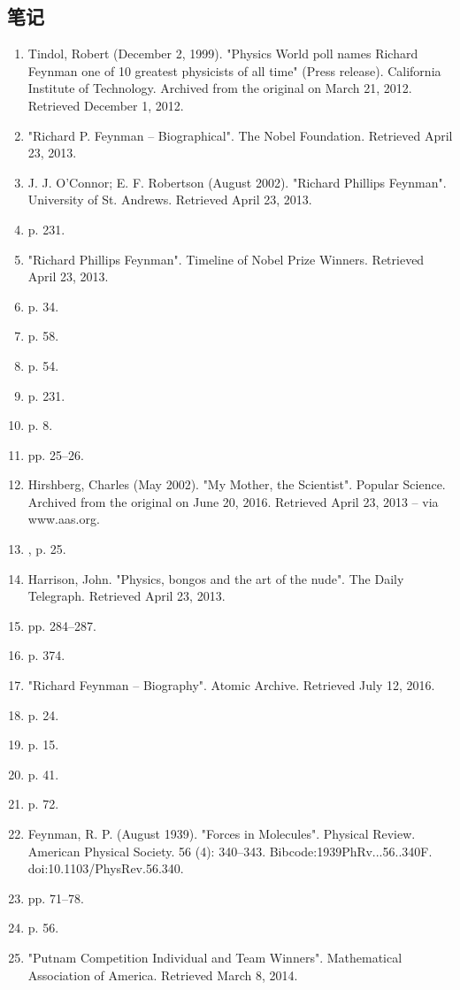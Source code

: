 \subsection{笔记}
\begin{enumerate}
\item Tindol, Robert (December 2, 1999). "Physics World poll names Richard Feynman one of 10 greatest physicists of all time" (Press release). California Institute of Technology. Archived from the original on March 21, 2012. Retrieved December 1, 2012.
\item "Richard P. Feynman – Biographical". The Nobel Foundation. Retrieved April 23, 2013.
\item J. J. O'Connor; E. F. Robertson (August 2002). "Richard Phillips Feynman". University of St. Andrews. Retrieved April 23, 2013.
\item  p. 231.
\item "Richard Phillips Feynman". Timeline of Nobel Prize Winners. Retrieved April 23, 2013.
\item  p. 34.
\item  p. 58.
\item  p. 54.
\item  p. 231.
\item  p. 8.
\item  pp. 25–26.
\item Hirshberg, Charles (May 2002). "My Mother, the Scientist". Popular Science. Archived from the original on June 20, 2016. Retrieved April 23, 2013 – via www.aas.org.
\item , p. 25.
\item Harrison, John. "Physics, bongos and the art of the nude". The Daily Telegraph. Retrieved April 23, 2013.
\item  pp. 284–287.
\item  p. 374.
\item "Richard Feynman – Biography". Atomic Archive. Retrieved July 12, 2016.
\item  p. 24.
\item  p. 15.
\item  p. 41.
\item  p. 72.
\item Feynman, R. P. (August 1939). "Forces in Molecules". Physical Review. American Physical Society. 56 (4): 340–343. Bibcode:1939PhRv...56..340F. doi:10.1103/PhysRev.56.340.
\item  pp. 71–78.
\item  p. 56.
\item "Putnam Competition Individual and Team Winners". Mathematical Association of America. Retrieved March 8, 2014.

\end{enumerate}

